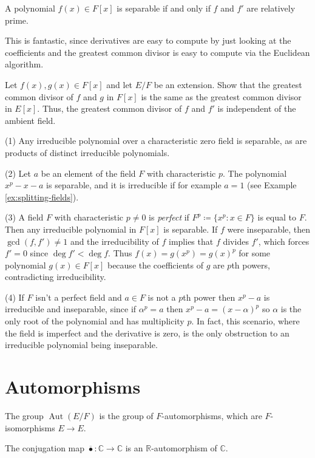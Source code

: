 \documentclass[10pt]{article}
\providecommand{\ol}{\overline}
\providecommand{\CC}{\mathbb C}
\providecommand{\RR}{\mathbb R}
\providecommand{\opname}{\operatorname}
\providecommand{\aut}{\opname{Aut}}
\providecommand{\vocab}[1]{{{\sffamily\textit{#1}}}}
\begin{document}
\begin{prop}
    \label{prop:separability-criterion}
    A polynomial $f(x)\in F[x]$ is separable
    if and only if $f$ and $f'$ are relatively prime.
\end{prop}

This is fantastic, since derivatives are easy to compute
by just looking at the coefficients
and the greatest common divisor is easy to compute
via the Euclidean algorithm.

\begin{exercise}
    \label{exer:gcd-invariant-of-ambient-field}
    Let $f(x),g(x)\in F[x]$ and let $E/F$ be an extension.
    Show that the greatest common divisor of $f$ and $g$ in $F[x]$
    is the same as the greatest common divisor in $E[x]$.
    Thus, the greatest common divisor of $f$ and $f'$ is
    independent of the ambient field.
\end{exercise}

\begin{example}
    \label{ex:inseparable-polynomials}
    (1) Any irreducible polynomial over a characteristic zero field
    is separable, as are products of distinct irreducible polynomials.

    (2) Let $a$ be an element of the field $F$
    with characteristic $p$. The polynomial $x^p - x - a$ is separable,
    and it is irreducible if for example $a = 1$
    (see Example \ref{ex:splitting-fields}).

    (3) A field $F$ with characteristic $p\ne 0$ is \vocab{perfect}
    if $F^p \coloneq \{x^p : x\in F\}$ is equal to $F$.
    Then any irreducible polynomial in $F[x]$ is separable.
    If $f$ were inseparable, then $\gcd(f,f')\ne 1$
    and the irreducibility of $f$ implies that $f$ divides $f'$,
    which forces $f' = 0$ since $\deg f' < \deg f$.
    Thus $f(x) = g(x^p) = g(x)^p$ for some polynomial $g(x)\in F[x]$ because
    the coefficients of $g$ are $p$th powers, contradicting irreducibility.

    (4) If $F$ isn't a perfect field and $a\in F$ is not a $p$th power
    then $x^p - a$ is irreducible and inseparable,
    since if $\alpha^p = a$ then $x^p - a = (x-\alpha)^p$
    so $\alpha$ is the only root of the polynomial
    and has multiplicity $p$.
    In fact, this scenario, where the field is imperfect
    and the derivative is zero, is the only obstruction
    to an irreducible polynomial being inseparable.
\end{example}

\section{Automorphisms}
\begin{definition}[Automorphism]
    \label{def:automorphism}
    The group $\aut(E/F)$ is the group of
    $F$-automorphisms, which are $F$-isomorphisms $E\to E$.
\end{definition}

\begin{example}
    \label{ex:F-automorphisms}
    The conjugation map $\ol\bullet\colon\CC\to\CC$
    is an $\RR$-automorphism of $\CC$.
\end{example}

\begin{prop}
    \label{prop:degree-and-aut}
    
\end{prop}
\end{document}
